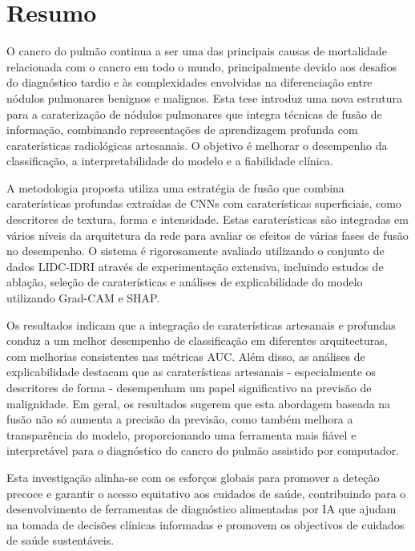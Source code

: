 \chapter*{Resumo}
%
O cancro do pulmão continua a ser uma das principais causas de mortalidade relacionada com o cancro em todo o mundo, principalmente devido aos desafios do diagnóstico tardio e às complexidades envolvidas na diferenciação entre nódulos pulmonares benignos e malignos. Esta tese introduz uma nova estrutura para a caraterização de nódulos pulmonares que integra técnicas de fusão de informação, combinando representações de aprendizagem profunda com caraterísticas radiológicas artesanais. O objetivo é melhorar o desempenho da classificação, a interpretabilidade do modelo e a fiabilidade clínica.

A metodologia proposta utiliza uma estratégia de fusão que combina caraterísticas profundas extraídas de CNNs com caraterísticas superficiais, como descritores de textura, forma e intensidade. Estas caraterísticas são integradas em vários níveis da arquitetura da rede para avaliar os efeitos de várias fases de fusão no desempenho. O sistema é rigorosamente avaliado utilizando o conjunto de dados LIDC-IDRI através de experimentação extensiva, incluindo estudos de ablação, seleção de caraterísticas e análises de explicabilidade do modelo utilizando Grad-CAM e SHAP.

Os resultados indicam que a integração de caraterísticas artesanais e profundas conduz a um melhor desempenho de classificação em diferentes arquitecturas, com melhorias consistentes nas métricas AUC. Além disso, as análises de explicabilidade destacam que as caraterísticas artesanais - especialmente os descritores de forma - desempenham um papel significativo na previsão de malignidade. Em geral, os resultados sugerem que esta abordagem baseada na fusão não só aumenta a precisão da previsão, como também melhora a transparência do modelo, proporcionando uma ferramenta mais fiável e interpretável para o diagnóstico do cancro do pulmão assistido por computador.

Esta investigação alinha-se com os esforços globais para promover a deteção precoce e garantir o acesso equitativo aos cuidados de saúde, contribuindo para o desenvolvimento de ferramentas de diagnóstico alimentadas por IA que ajudam na tomada de decisões clínicas informadas e promovem os objectivos de cuidados de saúde sustentáveis.

